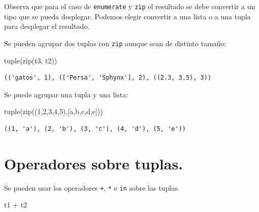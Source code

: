 \documentclass[
  spanish,
  letterpaper,
]{scrbook}
\newenvironment{Shaded}{\begin{snugshade}}{\end{snugshade}}
\newcommand{\BuiltInTok}[1]{\textcolor[rgb]{0.00,0.23,0.31}{#1}}
\newcommand{\DecValTok}[1]{\textcolor[rgb]{0.68,0.00,0.00}{#1}}
\newcommand{\NormalTok}[1]{\textcolor[rgb]{0.00,0.23,0.31}{#1}}
\newcommand{\OperatorTok}[1]{\textcolor[rgb]{0.37,0.37,0.37}{#1}}
\newcommand{\StringTok}[1]{\textcolor[rgb]{0.13,0.47,0.30}{#1}}
\theoremstyle{definition}
\theoremstyle{remark}
\begin{document}
Observa que para el caso de \texttt{enumerate} y \texttt{zip} el
resultado se debe convertir a un tipo que se pueda desplegar. Podemos
elegir convertir a una lista o a una tupla para desplegar el resultado.

Se pueden agrupar dos tuplas con \texttt{zip} aunque sean de distinto
tamaño:

\begin{Shaded}
\begin{Highlighting}[]
\BuiltInTok{tuple}\NormalTok{(}\BuiltInTok{zip}\NormalTok{(t3, t2))}
\end{Highlighting}
\end{Shaded}

\begin{verbatim}
(('gatos', 1), (['Persa', 'Sphynx'], 2), ((2.3, 3.5), 3))
\end{verbatim}

Se puede agrupar una tupla y una lista:

\begin{Shaded}
\begin{Highlighting}[]
\BuiltInTok{tuple}\NormalTok{(}\BuiltInTok{zip}\NormalTok{((}\DecValTok{1}\NormalTok{,}\DecValTok{2}\NormalTok{,}\DecValTok{3}\NormalTok{,}\DecValTok{4}\NormalTok{,}\DecValTok{5}\NormalTok{),[}\StringTok{\textquotesingle{}a\textquotesingle{}}\NormalTok{,}\StringTok{\textquotesingle{}b\textquotesingle{}}\NormalTok{,}\StringTok{\textquotesingle{}c\textquotesingle{}}\NormalTok{,}\StringTok{\textquotesingle{}d\textquotesingle{}}\NormalTok{,}\StringTok{\textquotesingle{}e\textquotesingle{}}\NormalTok{]))}
\end{Highlighting}
\end{Shaded}

\begin{verbatim}
((1, 'a'), (2, 'b'), (3, 'c'), (4, 'd'), (5, 'e'))
\end{verbatim}

\section{Operadores sobre tuplas.}\label{operadores-sobre-tuplas.}

Se pueden usar los operadores \texttt{+}, \texttt{*} e \texttt{in} sobre
las tuplas.

\begin{Shaded}
\begin{Highlighting}[]
\NormalTok{t1 }\OperatorTok{+}\NormalTok{ t2}
\end{Highlighting}
\end{Shaded}
\end{document}
